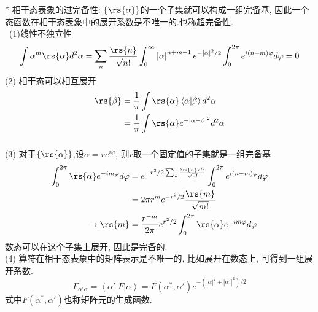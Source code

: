 \begin{frame} 
\frametitle{}
     * 相干态表象的过完备性: $\{\rs{\alpha}\}$的一个子集就可以构成一组完备基, 因此一个态函数在相干态表象中的展开系数是不唯一的.也称超完备性. \\ {\vspace*{0.3em}}
     \证~(1)线性不独立性
     \[ \begin{aligned}
         \int \alpha ^m \rs{\alpha} d^2 \alpha &= \sum_n \frac{\rs{n}}{\sqrt{n!}} \int_0 ^\infty \left|\alpha\right|^{n+m+1} e ^ {- \left|\alpha\right|^2 /2} \int_0 ^{2\pi} e ^{i(n+m)\varphi}  d \varphi =0\\
     \end{aligned}\] 
     (2) 相干态可以相互展开
     \[ \begin{aligned}
        \rs{ \beta } & = \frac{1}{\pi} \int \rs{\alpha} \left\langle \alpha | \beta \right\rangle  d ^2 \alpha \\ 
        &= \frac{1}{\pi} \int \rs{\alpha} e^{-  \left| \alpha - \beta\right|^2}  d ^2 \alpha
    \end{aligned}\] 
\end{frame}

\begin{frame} 
\frametitle{}
     (3) 对于$\{\rs{\alpha}\}$,设$\alpha = r e ^{i \varphi}$, 则$r$取一个固定值的子集就是一组完备基
      \[ \begin{aligned}
          \int _0 ^{2\pi} \rs{\alpha} e ^{-i m \varphi} d \varphi &= e^{- r^2 /2 \sum_n \frac{\rs{n} r^n}{\sqrt{n!}} } \int _0 ^{2\pi} e ^{i (n-m) \varphi} d \varphi \\
          &= 2\pi r^m e^{- r^2 /2}  \frac{\rs{m}}{\sqrt{m!}} \\
        \to \rs{m} &= \frac{r^{-m}}{2\pi}e^{ r^2 /2}  \int _0 ^{2\pi} \rs{\alpha} e ^{-i m \varphi} d \varphi 
      \end{aligned}\] 
      数态可以在这个子集上展开, 因此是完备的. \\ 
      (4) 算符在相干态表象中的矩阵表示是不唯一的, 比如展开在数态上, 可得到一组展开系数.
      \[ F_{\alpha' \alpha} = \left\langle \alpha' | F |\alpha \right\rangle = F(\alpha^*, \alpha')e^{-(\left|\alpha\right|^2+ \left|\alpha'\right|^2)/2}\]
      式中$ F(\alpha^*, \alpha')$也称矩阵元的生成函数.
\end{frame}

